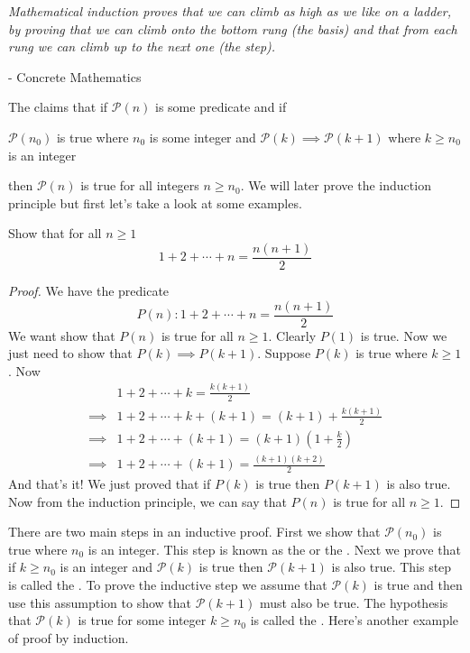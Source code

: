 \documentclass[11pt,numbers=noenddot,svgnames,dvipsnames]{scrartcl}
\begin{document}
\begin{center}
{\itshape
Mathematical induction proves that we can climb as high
as we like on a ladder, by proving that we can climb onto
the bottom rung (the basis) and that from each rung we
can climb up to the next one (the step).}
\end{center}
\begin{flushright}
\textsf{- Concrete Mathematics}
\end{flushright}

The  claims that if $\mathcal{P}(n)$ is some predicate and if
\begin{itemize}
        \ii $\mathcal{P}(n_{0})$ is true where $n_{0}$ is some integer and 
        \ii $\mathcal{P}(k) \implies \mathcal{P}(k+1)$ where $k\geq n_{0}$ is an integer
\end{itemize}
then $\mathcal{P}(n)$ is true for all integers $n \geq n_{0}$. We will later prove the induction principle but first 
let's take a look at some examples.

\begin{example}
    Show that for all $n \geq 1$
    \[
        1 + 2 + \cdots + n = \frac{n(n+1)}{2}
    \]
\end{example}
\begin{proof}
We have the predicate 
\[
    P(n) \colon 1 + 2 + \cdots + n = \frac{n(n+1)}{2} 
\]
We want show that $P(n)$ is true for all $n\geq 1$. Clearly $P(1)$ is true. Now we just need to show that 
$P(k) \implies P(k+1)$. Suppose $P(k)$ is true where $k \geq 1$. Now
\begin{align*}
             & 1 + 2 + \cdots + k = \frac{k(k+1)}{2} \\
    \implies & 1 + 2 + \cdots + k + (k+1) = (k+1) + \frac{k(k+1)}{2} \\
    \implies & 1 + 2 + \cdots + (k+1) = (k+1) \left(1 + \frac{k}{2}\right) \\
    \implies & 1 + 2 + \cdots + (k+1) = \frac{(k+1)(k + 2)}{2}
\end{align*}
And that's it! We just proved that if $P(k)$ is true then $P(k+1)$ is also true. Now from the induction 
principle, we can say that $P(n)$ is true for all $n \geq 1$. 
\end{proof}

There are two main steps in an inductive proof. First we show that $\mathcal{P}(n_{0})$ is 
true where $n_{0}$ is an integer. This step is known as the  or the . 
Next we prove that if $k \geq n_{0}$ is an integer and $\mathcal{P}(k)$ is true then 
$\mathcal{P}(k+1)$ is also true. This step is called the . 
To prove the inductive step we assume that $\mathcal{P}(k)$ is true and then use 
this assumption to show that $\mathcal{P}(k + 1)$ must also be true. The hypothesis that 
$\mathcal{P}(k)$ is true for some integer $k\geq n_{0}$ is called the . 
Here's another example of proof by induction.
\end{document}
